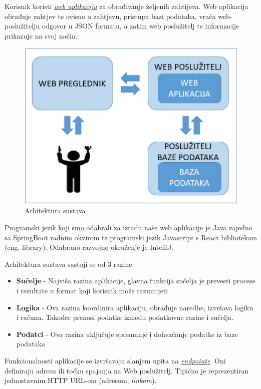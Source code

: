 	Korisnik koristi \underline{\textit{web aplikaciju}} za obrađivanje željenih zahtijeva. Web aplikacija obrađuje zahtjev te ovisno o zahtjevu, pristupa bazi podataka, vraća web-poslužitelju odgovor u JSON formatu, a zatim web poslužitelj te informacije prikazuje na svoj način.
		\begin{figure}[H]
                    \includegraphics[scale=1]{slike/Arhitektura sustava.jpg}
        			\centering
        			\caption{Arhitektura sustava}
        			\label{fig:arhitekturaSustava}
        		\end{figure}
			
			\eject

	Programski jezik koji smo odabrali za izradu naše web aplikacije je Java zajedno sa SpringBoot radnim okvirom te programski jezik Javascript s React bibliotekom (eng. library). Odabrano razvojno okruženje je IntelliJ. 
	
	Arhitektura sustava sastoji se od 3 razine:
	\begin{itemize}
		\item{\textbf{Sučelje} - Najviša razina aplikacije, glavna funkcija sučelja je prevesti procese i rezultate u format koji korisnik može razumijeti}
		\item{\textbf{Logika} - Ova razina koordinira aplikaciju, obrađuje naredbe, izvršava logiku i računa. Također prenosi podatke između podatkovne razine i sučelja.}
		\item{\textbf{Podatci} - Ova razina uključuje spremanje i dohvaćanje podatke iz baze podataka}		
	\end{itemize}
	
	Funkcionalnosti aplikacije se izvršavaju slanjem upita na \textit{\underline{endpointe}}. Oni definiraju adresu ili točku spajanja na Web poslužitelj. Tipično je reprezentiran jednostavnim HTTP URL-om (adresom, \textit{linkom}).
	
